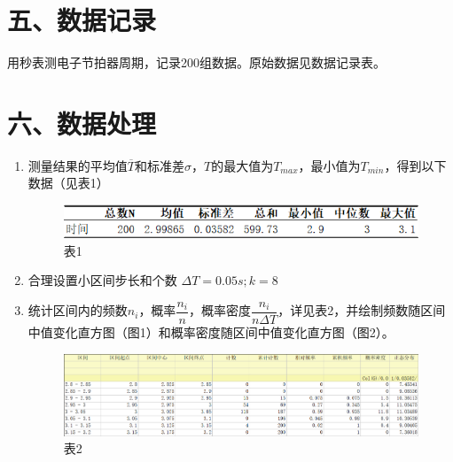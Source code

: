 \documentclass[11pt]{article}
\begin{document}
\section*{五、数据记录}

用秒表测电子节拍器周期，记录200组数据。原始数据见数据记录表。

\section*{六、数据处理}

\begin{enumerate}
    \item 测量结果的平均值$\overline{T}$和标准差$\sigma$，$T$的最大值为$T_{max}$，最小值为$T_{min}$，得到以下数据（见表1）
    \begin{figure}[H]
        \centering
        \includegraphics[width=15cm]{Fig/Table1.png}\\
        \small{表1}
    \end{figure}
    \item 合理设置小区间步长和个数 $\Delta T=0.05s; k=8$
    \item 统计区间内的频数$n_i$，概率$\dfrac{n_i}{n}$，概率密度$\dfrac{n_i}{n\Delta T}$，详见表2，并绘制频数随区间中值变化直方图（图1）和概率密度随区间中值变化直方图（图2）。
    \begin{figure}[H]
        \centering
        \includegraphics[width=15cm]{Fig/Table2.png}\\
        \small{表2}
    \end{figure}
    \begin{figure}[H]
    \centering

\end{figure}
\end{enumerate}
\end{document}
